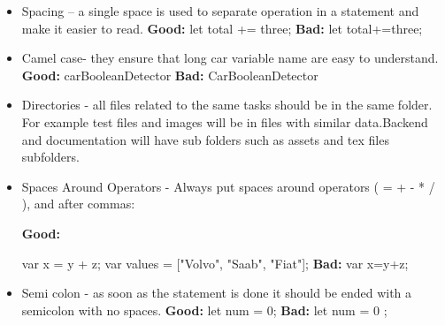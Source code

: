 \documentclass[10pt]{article}
\begin{document}
\begin{itemize}
        \item	Spacing – a single space is used to separate operation in a statement and make it easier to read.
        \newline
	        \textbf{Good:} let total += three;
	        \newline \textbf{Bad:} let total+=three;
	        \newline 
	        
        \item Camel case- they ensure that long car variable name are easy to understand.
        \newline
	        \textbf{Good:}
	        \newline carBooleanDetector
	        \newline \textbf{Bad:}
	        \newline CarBooleanDetector
	        
        \item   Directories - all files related to the same tasks should be in the same folder. For example test files and images will be in files with similar data.Backend and documentation will have sub folders such as assets and tex files subfolders.
        \newline
	      
	   
	   \item Spaces Around Operators - Always put spaces around operators ( = + - * / ), and after commas:

 \textbf{Good:}
 
        \newline var x = y + z;
        \newline var values = ["Volvo", "Saab", "Fiat"];
	        \newline \textbf{Bad:} var x=y+z;
	        \newline 

	   \newline
	        
        \item Semi colon - as soon as the statement is done it should be ended with a semicolon with no spaces.
        \newline
	        \textbf{Good:} let num = 0;
	        \newline \textbf{Bad:} let num = 0 ;
	        \newline 
	        

\end{itemize}
\end{document}

